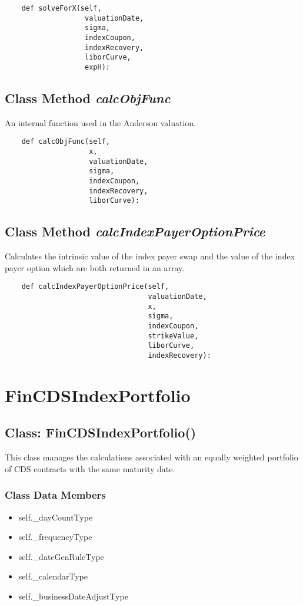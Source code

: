 \documentclass[twoside,11pt]{book}
\begin{document}
\begin{lstlisting}
    def solveForX(self,
                   valuationDate,
                   sigma,
                   indexCoupon,
                   indexRecovery,
                   liborCurve,
                   expH):
\end{lstlisting}

\subsection{Class Method {\it calcObjFunc}}
An internal function used in the Anderson valuation. 

\begin{lstlisting}
    def calcObjFunc(self,
                    x,
                    valuationDate,
                    sigma,
                    indexCoupon,
                    indexRecovery,
                    liborCurve):
\end{lstlisting}

\subsection{Class Method {\it calcIndexPayerOptionPrice}}
Calculates the intrinsic value of the index payer swap and the value of the index payer option which are both returned in an array. 

\begin{lstlisting}
    def calcIndexPayerOptionPrice(self, 
                                  valuationDate,
                                  x,
                                  sigma,
                                  indexCoupon,
                                  strikeValue,
                                  liborCurve,
                                  indexRecovery):
\end{lstlisting}

\newpage
\section{FinCDSIndexPortfolio}

\subsection{Class: FinCDSIndexPortfolio()}
This class manages the calculations associated with an equally weighted portfolio of CDS contracts with the same maturity date. 

\subsubsection{Class Data Members}
\begin{itemize}
\item{self.\_dayCountType}
\item{self.\_frequencyType}
\item{self.\_dateGenRuleType}
\item{self.\_calendarType}
\item{self.\_businessDateAdjustType}
\end{itemize}
\end{document}
